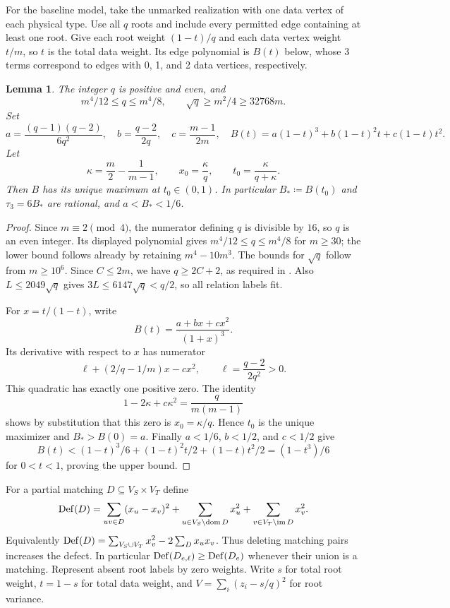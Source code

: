 \documentclass[10pt]{article}
\numberwithin{equation}{section}
\newtheorem{lemma}[lemma]{Lemma}\aliascntresetthe{lemma}
\theoremstyle{definition}
\begin{document}
For the baseline model, take the unmarked realization with one data vertex of each physical type. Use all $q$ roots and include every permitted edge containing at least one root. Give each root weight $(1-t)/q$ and each data vertex weight $t/m$, so $t$ is the total data weight. Its edge polynomial is $B(t)$ below, whose 3 terms correspond to edges with 0, 1, and 2 data vertices, respectively.

\begin{lemma}
\label{lem:wi-rational-baseline}
The integer $q$ is positive and even, and
\[
 m^4/12\le q\le m^4/8,\qquad
 \sqrt q\ge m^2/4\ge32768m.
\]
Set
\[
 a=\frac{(q-1)(q-2)}{6q^2},\quad
 b=\frac{q-2}{2q},\quad c=\frac{m-1}{2m},\quad
 B(t)=a(1-t)^3+b(1-t)^2t+c(1-t)t^2.
\]
Let
\[
 \kappa=\frac m2-\frac1{m-1},\qquad
 x_0=\frac\kappa q,\qquad t_0=\frac\kappa{q+\kappa}.
\]
Then $B$ has its unique maximum at $t_0\in(0,1)$. In particular $B_*\coloneqq B(t_0)$ and $\tau_3=6B_*$ are rational, and $a<B_*<1/6$.
\end{lemma}
\begin{proof}
Since $m\equiv2\pmod4$, the numerator defining $q$ is divisible by $16$, so $q$ is an even integer. Its displayed polynomial gives $m^4/12\le q\le m^4/8$ for $m\ge30$; the lower bound follows already by retaining $m^4-10m^3$. The bounds for $\sqrt q$ follow from $m\ge10^6$. Since $C\le2m$, we have $q\ge2C+2$, as required in . Also $L\le2049\sqrt q$ gives $3L\le6147\sqrt q<q/2$, so all relation labels fit.

For $x=t/(1-t)$, write
\[
 B(t)=\frac{a+bx+cx^2}{(1+x)^3}.
\]
Its derivative with respect to $x$ has numerator
\[
 \ell+(2/q-1/m)x-cx^2,\qquad \ell=\frac{q-2}{2q^2}>0.
\]
This quadratic has exactly one positive zero. The identity
\[
 1-2\kappa+c\kappa^2=\frac{q}{m(m-1)}
\]
shows by substitution that this zero is $x_0=\kappa/q$. Hence $t_0$ is the unique maximizer and $B_*>B(0)=a$. Finally $a<1/6$, $b<1/2$, and $c<1/2$ give
\[
 B(t)<(1-t)^3/6+(1-t)^2t/2+(1-t)t^2/2=(1-t^3)/6
\]
for $0<t<1$, proving the upper bound.
\end{proof}

For a partial matching $D\subseteq V_S\times V_T$ define
\[
 \operatorname{Def}(D)=\sum_{uv\in D}(x_u-x_v)^2+
 \sum_{u\in V_S\setminus\operatorname{dom}D}x_u^2+
 \sum_{v\in V_T\setminus\operatorname{im}D}x_v^2.
\]
Equivalently $\operatorname{Def}(D)=\sum_{V_S\cup V_T}x_v^2-2\sum_Dx_ux_v$. Thus deleting matching pairs increases the defect. In particular $\operatorname{Def}(D_{e,\ell})\ge\operatorname{Def}(D_e)$ whenever their union is a matching. Represent absent root labels by zero weights. Write $s$ for total root weight, $t=1-s$ for total data weight, and $V=\sum_i(z_i-s/q)^2$ for root variance.
\end{document}

